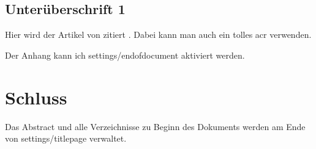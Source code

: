 \documentclass[a4paper, 12pt]{article}
\begin{document}
\subsection{Unterüberschrift 1}

Hier wird der Artikel von \textcite{Abadi.2016} zitiert \parencite{Abadi.2016}. Dabei kann man auch ein tolles \gls{acr} verwenden.

Der Anhang kann ich settings/endofdocument aktiviert werden.

\section{Schluss}

Das Abstract und alle Verzeichnisse zu Beginn des Dokuments werden am Ende von settings/titlepage verwaltet.

\newpage

\end{document}
